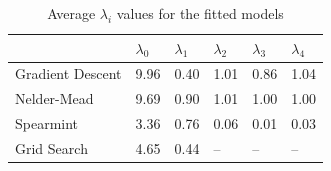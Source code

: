 \documentclass[12pt]{article}
\begin{document}
\begin{table}
\caption {\label{tab:additive_average_lambda} Average $\lambda_i$ values for the fitted models}
\centering
\begin{tabular}{| l | l | l | l | l | l | }
\hline
& $\lambda_0$ & $\lambda_1$ & $\lambda_2$ & $\lambda_3$ & $\lambda_4$\\
\hline
Gradient Descent & 9.96 & 0.40 & 1.01 & 0.86 & 1.04 \\
\hline
Nelder-Mead & 9.69 & 0.90 & 1.01 & 1.00 & 1.00 \\
\hline
Spearmint & 3.36 & 0.76 & 0.06 & 0.01 & 0.03\\
\hline
Grid Search & 4.65 & 0.44 & -- & -- & -- \\
\hline
\end{tabular}
\end{table}
\end{document}
